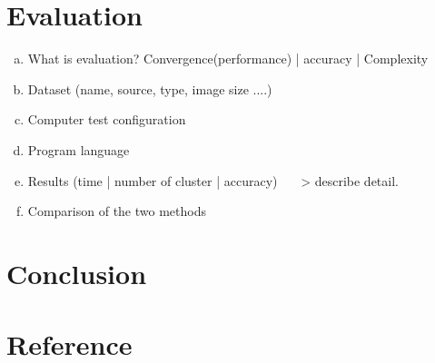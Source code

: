 \documentclass[13pt,a4paper]{report}
\begin{document}
\section{Evaluation}

\begin{enumerate}[(a) ]
\item What is evaluation? Convergence(performance) | accuracy | Complexity
\item Dataset (name, source, type, image size ....)
\item Computer test configuration
\item Program language
\item Results (time | number of cluster | accuracy) ~~~> describe detail.
\item Comparison of the two methods
\end{enumerate}
	
	
\section{Conclusion}
\section{Reference}
\end{document}
